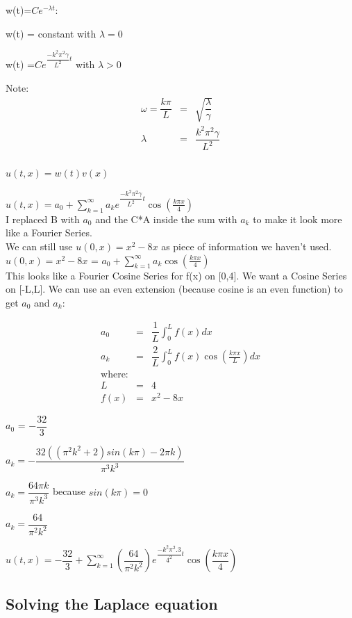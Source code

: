 \documentclass{article}
\newcommand{\bea}{\begin{eqnarray*}}
\newcommand{\eea}{\end{eqnarray*}}
\newcommand{\red}[1]{\textcolor{red}{#1}}
\begin{document}
w(t)=$Ce^{-\lambda t}$:

w(t) = constant with  $\lambda = 0$

w(t) =$Ce^{\dfrac{-k^2 \pi^2 \gamma }{L^2}t}$ with $\lambda > 0$

Note: \bea
\omega= \dfrac{k \pi}{L} &=& \sqrt{\dfrac{\lambda}{\gamma}} \\
\lambda &=& \dfrac{k^2 \pi^2 \gamma }{L^2} \\
\eea

$u(t,x) = w(t)v(x)$

$u(t,x) = a_0 + \sum_{k=1}^{\infty} a_k e^{\dfrac{-k^2 \pi^2 \gamma }{L^2}t} \cos\left(\frac{k \pi x}{4}\right)$ \\ 

I replaced B with $a_0$ and the C*A inside the sum with $a_k$ to make it look more like a Fourier Series. \\

We can still use $u(0,x)=x^2-8x$ as piece of information we haven't used.\\

$u(0,x)=x^2-8x$ = $a_0 + \sum_{k=1}^{\infty} a_k \cos\left(\frac{k \pi x}{4}\right)$ \\

This looks like a Fourier Cosine Series for f(x) on [0,4]. We want a Cosine Series on [-L,L]. We can use an even extension (because cosine is an even function) to get $a_0$ and $a_k$:

\bea
a_0 &=& \dfrac{1}{L}\int_{0}^{L} f(x)dx \\
a_k &=& \dfrac{2}{L}\int_{0}^{L} f(x)\cos\left(\frac{k \pi x}{L}\right)dx \\
\mbox{where}: \\
L&=&4\\
f(x) &=& x^2-8x
\eea

$a_0$ = $-\dfrac{32}{3}$

$a_k = -\dfrac{32((\pi^2 k^2 +2)sin(k \pi) - 2 \pi k)}{\pi^3 k ^3}$

$a_k = \dfrac{64 \pi k}{\pi^3 k ^3}$ because $sin(k\pi) = 0$ \newline

$a_k = \dfrac{64}{\pi^2 k ^2}$ \newline

$u(t,x) = -\dfrac{32}{3} + \sum_{k=1}^{\infty} \left(\dfrac{64}{\pi^2 k ^2}\right) e^{\dfrac{-k^2 \pi^2 .3 }{4^2}t} \cos\left(\dfrac{k \pi x}{4}\right)$ \\ 


\subsection{Solving the Laplace equation}
 
\end{document}
